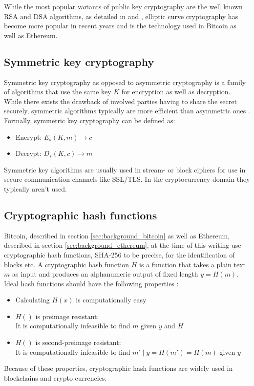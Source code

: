 \documentclass[12pt,msc,a4paper,oneside]{ucl_thesis}
\begin{document}
While the most popular variants of public key cryptography are the well known RSA and DSA algorithms, as detailed in \cite{RSA:1978:MOD:359340.359342} and \cite{Kerry13fipspub}, elliptic curve cryptography has become more popular in recent years and is the technology used in Bitcoin as well as Ethereum. 

\subsection{Symmetric key cryptography}
Symmetric key cryptography as opposed to asymmetric cryptography is a family of algorithms that use the same key $K$ for encryption as well as decryption. While there exists the drawback of involved parties having to share the secret securely, symmetric algorithms typically are more efficient than asymmetric ones \cite{BKarp}. Formally, symmetric key cryptography can be defined as:
\begin{itemize}
    \item{Encrypt: } $E_s(K, m) \rightarrow c$
    \item{Decrypt: } $D_s(K, c) \rightarrow m$
\end{itemize}
Symmetric key algorithms are usually used in stream- or block ciphers for use in secure communication channels like SSL/TLS. In the cryptocurrency domain they typically aren't used.

\subsection{Cryptographic hash functions}
Bitcoin, described in section \ref{sec:background_bitcoin} as well as Ethereum, described in section \ref{sec:background_ethereum}, at the time of this writing use cryptographic hash functions, SHA-256 to be precise, for the identification of blocks etc. A cryptographic hash function $H$ is a function that takes a plain text $m$ as input and produces an alphanumeric output of fixed length $y = H(m)$. Ideal hash functions should have the following properties \cite{BKarp} \cite{wiki:cryptographic_hash_fn}:
\begin{itemize}
    \item{Calculating $H(x)$ is computationally easy}
    \item{$H()$ is preimage resistant: } \\ It is computationally infeasible to find $m$ given $y$ and $H$
    \item{$H()$ is second-preimage resistant: } \\ It is computationally infeasible to find $m' \mid y=H(m')=H(m)$ given $y$
\end{itemize}
Because of these properties, cryptographic hash functions are widely used in blockchains and crypto currencies.
\end{document}
